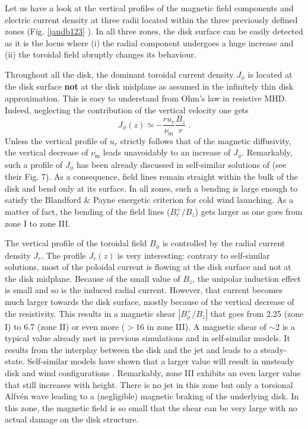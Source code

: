 \documentclass{aa}
\begin{document}
Let us have a look at the vertical profiles of the magnetic field components and electric current density at three radii located within the three previously defined zones (Fig. \ref{jandb123} ). In
all three zones, the disk surface can be easily detected as it is the locus where (i) the radial component undergoes a huge increase and (ii) the toroidal field abruptly changes its behaviour.

Throughout all the disk, the dominant toroidal current density $J_\phi$ is located at the disk surface {\bf not} at the disk midplane as assumed in the infinitely thin disk approximation.  This is
easy to understand from Ohm's law in resistive MHD. Indeed, neglecting the contribution of the vertical velocity one gets
\begin{equation}
J_\phi(z) \simeq - \frac{r u_r}{\nu_\mathrm{m}} \frac{B_z}{r} \; .
\end{equation}
Unless the vertical profile of $u_r$ strictly follows that of the magnetic diffusivity, the vertical decrease of $\nu_\mathrm{m}$ leads unavoidably to an increase of $J_\phi$.  Remarkably, such a profile of
$J_\phi$ has been already discussed in self-similar solutions of \citet{2000A&A...353.1115C} (see their Fig. 7).  As a consequence, field lines remain straight within the bulk of the disk and bend only
at its surface. In all zones, such a bending is large enough to satisfy the Blandford \& Payne energetic criterion for cold wind launching. As a matter of fact, the bending of the field lines
($B^+_r/B_z$) gets larger as one goes from zone I to zone III.


The vertical profile of the toroidal field $B_\phi$ is controlled by the radial current density $J_r$. The profile $J_r(z)$ is very interesting: contrary to self-similar solutions, most of the
poloidal current is flowing at the disk surface and not at the disk midplane. Because of the small value of $B_z$, the unipolar induction effect is small and so is the induced radial current. However,
that current becomes much larger towards the disk surface, mostly because of the vertical decrease of the resistivity. This results in a magnetic shear $|B_\phi^+/B_z |$ that goes from 2.25 (zone I)
to 6.7 (zone II) or even more ($>16$ in zone III). A magnetic shear of $\sim 2$ is a typical value already met in previous simulations and in self-similar models. It results from the interplay between
the disk and the jet and leads to a steady-state. Self-similar models have shown that a larger value will result in unsteady disk and wind configurations
\citep{1993ApJ...410..218W,1997A&A...319..340F}. Remarkably, zone III exhibits an even larger value that still increases with height. There is no jet in this zone but only a torsional Alfv\'en wave
leading to a (negligible) magnetic braking of the underlying disk. In this zone, the magnetic field is so small that the shear can be very large with no actual damage on the disk structure.
\end{document}
